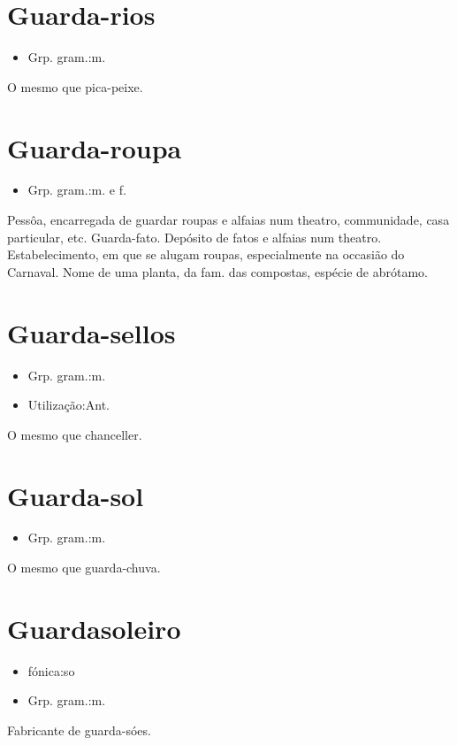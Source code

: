 \section{Guarda-rios}
\begin{itemize}
\item {Grp. gram.:m.}
\end{itemize}
O mesmo que \textunderscore pica-peixe\textunderscore .
\section{Guarda-roupa}
\begin{itemize}
\item {Grp. gram.:m.  e  f.}
\end{itemize}
Pessôa, encarregada de guardar roupas e alfaias num theatro, communidade, casa particular, etc.
Guarda-fato.
Depósito de fatos e alfaias num theatro.
Estabelecimento, em que se alugam roupas, especialmente na occasião do Carnaval.
Nome de uma planta, da fam. das compostas, espécie de abrótamo.
\section{Guarda-sellos}
\begin{itemize}
\item {Grp. gram.:m.}
\end{itemize}
\begin{itemize}
\item {Utilização:Ant.}
\end{itemize}
O mesmo que \textunderscore chanceller\textunderscore .
\section{Guarda-sol}
\begin{itemize}
\item {Grp. gram.:m.}
\end{itemize}
O mesmo que \textunderscore guarda-chuva\textunderscore .
\section{Guardasoleiro}
\begin{itemize}
\item {fónica:so}
\end{itemize}
\begin{itemize}
\item {Grp. gram.:m.}
\end{itemize}
Fabricante de guarda-sóes.
